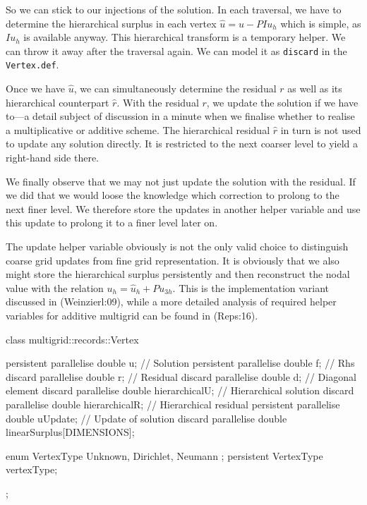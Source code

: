 So we can stick to our injections of the solution. 
In each traversal, we have to determine the hierarchical surplus in each vertex
$\hat u = u - PIu_h$ which is simple, as $Iu_h$ is available anyway.
This hierarchical transform is a temporary helper. 
We can throw it away after the traversal again.
We can model it as \texttt{discard} in the \texttt{Vertex.def}.

Once we have $\hat u$, we can simultaneously determine the residual $r$ as well
as its hierarchical counterpart $\hat r$. 
With the residual $r$, we update the solution if we have to---a detail subject
of discussion in a minute when we finalise whether to realise a multiplicative
or additive scheme.
The hierarchical residual $\hat r$ in turn is not used to update any solution
directly.
It is restricted to the next coarser level to yield a right-hand side there.


We finally observe that we may not just update the solution with the residual.
If we did that we would loose the knowledge which correction to prolong to the
next finer level.
We therefore store the updates in another helper variable and use this update to
prolong it to a finer level later on.

\begin{remark}
  The update helper variable obviously is not the only valid choice to
  distinguish coarse grid updates from fine grid representation. It is obviously
  that we also might store the hierarchical surplus persistently and then
  reconstruct the nodal value with the relation $u_h=\hat u_h+Pu_{3h}$. This is
  the implementation variant discussed in (Weinzierl:09), while a more detailed
  analysis of required helper variables for additive multigrid can be found in
  (Reps:16).
\end{remark}



\begin{code}
class multigrid::records::Vertex {  
  persistent parallelise double  u;             // Solution
  persistent parallelise double  f;             // Rhs
  discard parallelise double     r;             // Residual
  discard parallelise double     d;             // Diagonal element
  discard parallelise double     hierarchicalU; // Hierarchical solution
  discard parallelise double     hierarchicalR; // Hierarchical residual
  persistent parallelise double  uUpdate;       // Update of solution
  discard parallelise double     linearSurplus[DIMENSIONS];

  enum VertexType {
    Unknown, Dirichlet, Neumann
  };
  persistent VertexType vertexType;
};
\end{code}


